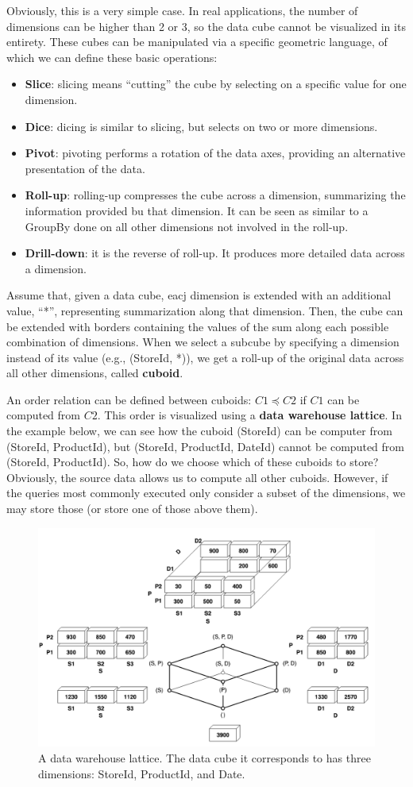 Obviously, this is a very simple case. In real applications, the number of dimensions can be higher than 2 or 3, so the data cube cannot be visualized in its entirety. These cubes can be manipulated via a specific geometric language, of which we can define these basic operations:
\begin{itemize}
    \item \textbf{Slice}: slicing means ``cutting'' the cube by selecting on a specific value for one dimension.

    \item \textbf{Dice}: dicing is similar to slicing, but selects on two or more dimensions.

    \item \textbf{Pivot}: pivoting performs a rotation of the data axes, providing an alternative presentation of the data.

    \item \textbf{Roll-up}: rolling-up compresses the cube across a dimension, summarizing the information provided bu that dimension. It can be seen as similar to a GroupBy done on all other dimensions not involved in the roll-up.

    \item \textbf{Drill-down}: it is the reverse of roll-up. It produces more detailed data across a dimension.
\end{itemize}

Assume that, given a data cube, eacj dimension is extended with an additional value, ``*'', representing summarization along that dimension. Then, the cube can be extended with borders containing the values of the sum along each possible combination of dimensions. When we select a subcube by specifying a dimension instead of its value (e.g., (StoreId, *)), we get a roll-up of the original data across all other dimensions, called \textbf{cuboid}.

An order relation can be defined between cuboids: $C1 \preceq C2$ if $C1$ can be computed from $C2$. This order is visualized using a \textbf{data warehouse lattice}. In the example below, we can see how the cuboid (StoreId) can be computer from (StoreId, ProductId), but (StoreId, ProductId, DateId) cannot be computed from (StoreId, ProductId). So, how do we choose which of these cuboids to store? Obviously, the source data allows us to compute all other cuboids. However, if the queries most commonly executed only consider a subset of the dimensions, we may store those (or store one of those above them).

\begin{figure}[h]
    \centering
    \includegraphics[width=0.8\linewidth]{img/lattice.png}
    \caption{A data warehouse lattice. The data cube it corresponds to has three dimensions: StoreId, ProductId, and Date.}
    \label{fig:lattice}
\end{figure}